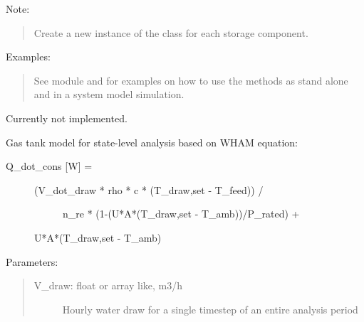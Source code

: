 \documentclass[letterpaper,10pt,english,openany]{sphinxmanual}
\begin{document}
\begin{fulllineitems}
Note:
\begin{quote}

Create a new instance of the class for each storage component.
\end{quote}

Examples:
\begin{quote}

See  module and
for examples on how to use the methods as stand alone and
in a system model simulation.
\end{quote}

\begin{fulllineitems}
\label{\detokenize{source/mswh.system:mswh.system.components.Storage.electric_tank_wh}}
Currently not implemented.

\end{fulllineitems}


\begin{fulllineitems}
\label{\detokenize{source/mswh.system:mswh.system.components.Storage.gas_tank_wh}}
Gas tank model for state-level analysis based on WHAM equation:
\begin{description}
\item[{Q\_dot\_cons {[}W{]} =}] \leavevmode\begin{description}
\item[{(V\_dot\_draw * rho * c * (T\_draw,set - T\_feed)) /}] \leavevmode
n\_re * (1-(U*A*(T\_draw,set - T\_amb))/P\_rated) +

\end{description}

U*A*(T\_draw,set - T\_amb)

\end{description}

Parameters:
\begin{quote}
\begin{description}
\item[{V\_draw: float or array like, m3/h}] \leavevmode
Hourly water draw for a single timestep of
an entire analysis period


\end{description}
\end{quote}
\end{fulllineitems}
\end{fulllineitems}
\end{document}
